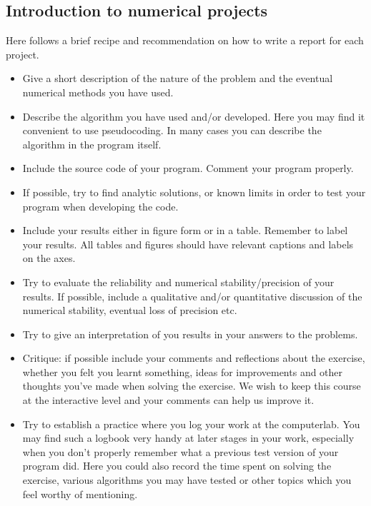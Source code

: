 \documentclass[%
oneside,                 %
final,                   %
10pt]{article}
\begin{document}
\subsection{Introduction to numerical projects}

Here follows a brief recipe and recommendation on how to write a report for each
project.

\begin{itemize}
  \item Give a short description of the nature of the problem and the eventual  numerical methods you have used.

  \item Describe the algorithm you have used and/or developed. Here you may find it convenient to use pseudocoding. In many cases you can describe the algorithm in the program itself.

  \item Include the source code of your program. Comment your program properly.

  \item If possible, try to find analytic solutions, or known limits in order to test your program when developing the code.

  \item Include your results either in figure form or in a table. Remember to        label your results. All tables and figures should have relevant captions        and labels on the axes.

  \item Try to evaluate the reliability and numerical stability/precision of your results. If possible, include a qualitative and/or quantitative discussion of the numerical stability, eventual loss of precision etc.

  \item Try to give an interpretation of you results in your answers to  the problems.

  \item Critique: if possible include your comments and reflections about the  exercise, whether you felt you learnt something, ideas for improvements and  other thoughts you've made when solving the exercise. We wish to keep this course at the interactive level and your comments can help us improve it.

  \item Try to establish a practice where you log your work at the  computerlab. You may find such a logbook very handy at later stages in your work, especially when you don't properly remember  what a previous test version  of your program did. Here you could also record  the time spent on solving the exercise, various algorithms you may have tested or other topics which you feel worthy of mentioning.
\end{itemize}
\end{document}

